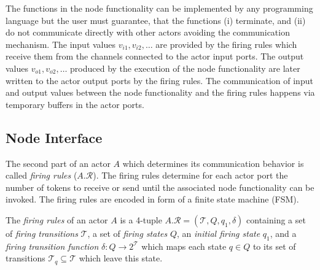 The functions in the node functionality can be implemented by any
programming language %
but the user must guarantee, that the functions
(i) terminate, and (ii) do not communicate directly with other actors
avoiding the \SysteMoC{} communication mechanism.
The input values $v_{i1}, v_{i2}, \ldots$ are provided by the firing rules
which receive them from the channels connected to the actor input ports.
The output values $v_{o1}, v_{o2}, \ldots$ produced by the execution of
the node functionality are later written to the actor output ports by
the firing rules. The communication of input and output values between the
node functionality and the firing rules happens via temporary buffers in
the actor ports.

\subsection{Node Interface}\label{node-interface}

The second part of an actor $A$ which determines its communication
behavior is called \emph{firing rules} ($A.\mathcal{R}$). The firing rules
determine for each actor port the number of tokens to receive or send
until the associated node functionality can be invoked.
The firing rules are encoded in form of a finite state machine (FSM).

\begin{definition}\label{firing-rules}
  The \emph{firing rules} of an actor $A$ is a 4-tuple $A.\mathcal{R} = (\mathcal{T}, Q, q_1, \delta)$
  containing a set of \emph{firing transitions} $\mathcal{T}$,  a set of \emph{firing states} $Q$,
  an \emph{initial firing state} $q_1$, and a \emph{firing transition function} $\delta: Q \to 2^\mathcal{T}$
  which maps each state $q \in Q$ to its set of transitions
  $\mathcal{T}_q \subseteq \mathcal{T}$ which leave this state.
\end{definition}

